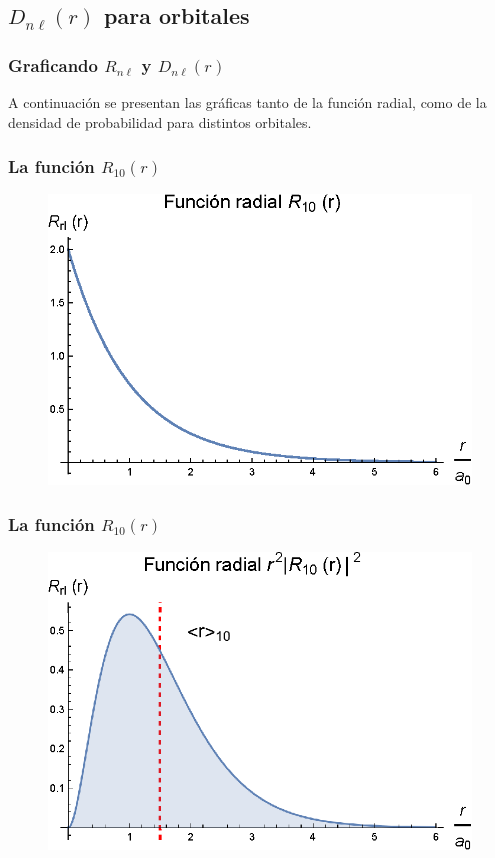 \documentclass[12pt]{beamer}
\begin{document}
\subsection{\texorpdfstring{$D_{n \ell} (r)$}{Dnl (r)} para orbitales}

\begin{frame}
\frametitle{Graficando $R_{n \ell}$ y $D_{n \ell} (r)$}
A continuación se presentan las gráficas tanto de la función radial, como de la densidad de probabilidad para distintos orbitales.
\end{frame}
\begin{frame}
\frametitle{La función $R_{10} (r)$}
\begin{figure}
   \centering
   \includegraphics[scale=1]{Imagenes/Plot_Funcion_Radial_Hidrogeno_10_01.eps}
\end{figure}
\end{frame}
\begin{frame}
\frametitle{La función $R_{10} (r)$}
\begin{figure}
   \centering
   \includegraphics[scale=1]{Imagenes/Plot_Funcion_Radial_Hidrogeno_10_02.eps}
\end{figure}
\end{frame}
\end{document}
